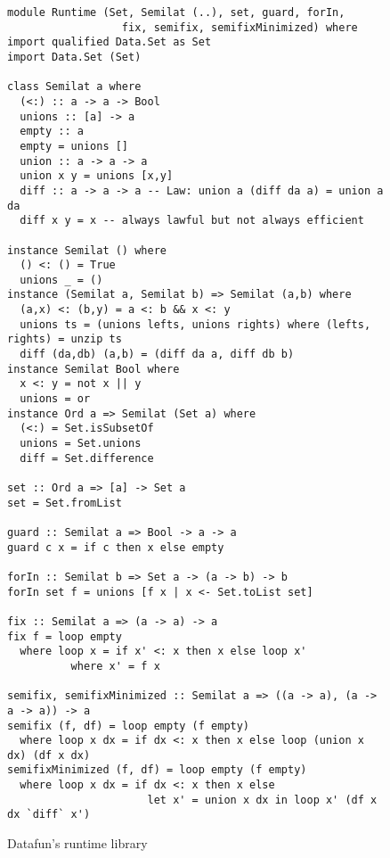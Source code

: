 \begin{figure}
  \footnotesize
  \begin{lstlisting}    
module Runtime (Set, Semilat (..), set, guard, forIn,
                  fix, semifix, semifixMinimized) where
import qualified Data.Set as Set
import Data.Set (Set)

class Semilat a where
  (<:) :: a -> a -> Bool
  unions :: [a] -> a
  empty :: a
  empty = unions []
  union :: a -> a -> a
  union x y = unions [x,y]
  diff :: a -> a -> a -- Law: union a (diff da a) = union a da
  diff x y = x -- always lawful but not always efficient

instance Semilat () where
  () <: () = True
  unions _ = ()
instance (Semilat a, Semilat b) => Semilat (a,b) where
  (a,x) <: (b,y) = a <: b && x <: y
  unions ts = (unions lefts, unions rights) where (lefts, rights) = unzip ts
  diff (da,db) (a,b) = (diff da a, diff db b)
instance Semilat Bool where
  x <: y = not x || y
  unions = or
instance Ord a => Semilat (Set a) where
  (<:) = Set.isSubsetOf
  unions = Set.unions
  diff = Set.difference

set :: Ord a => [a] -> Set a
set = Set.fromList

guard :: Semilat a => Bool -> a -> a
guard c x = if c then x else empty

forIn :: Semilat b => Set a -> (a -> b) -> b
forIn set f = unions [f x | x <- Set.toList set]

fix :: Semilat a => (a -> a) -> a
fix f = loop empty
  where loop x = if x' <: x then x else loop x'
          where x' = f x

semifix, semifixMinimized :: Semilat a => ((a -> a), (a -> a -> a)) -> a
semifix (f, df) = loop empty (f empty)
  where loop x dx = if dx <: x then x else loop (union x dx) (df x dx)
semifixMinimized (f, df) = loop empty (f empty)
  where loop x dx = if dx <: x then x else
                      let x' = union x dx in loop x' (df x dx `diff` x')
  \end{lstlisting}
  \caption{Datafun's runtime library}
  \label{figure-runtime-library}
\end{figure}
